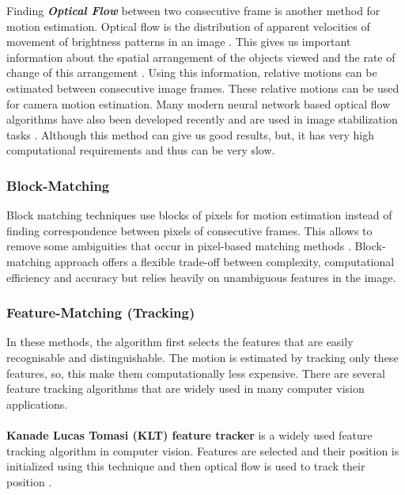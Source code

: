 Finding  \textbf{\textit{Optical Flow}} between two consecutive frame is another method for motion estimation. Optical flow is the distribution of apparent velocities of movement of brightness patterns in an image \citep{horn1981determining}. This gives us important information about the spatial arrangement of the objects viewed and the rate of change of this arrangement \citep{gibson1977analysis}. Using this information, relative motions can be estimated between consecutive image frames. These relative motions can be used for camera motion estimation. Many modern neural network based optical flow algorithms have also been developed recently and are used in image stabilization tasks \citep{deep_opti_stab}. Although this method can give us good results, but, it has very high computational requirements and thus can be very slow.

\subsubsection{Block-Matching}
Block matching techniques use blocks of pixels for motion estimation instead of finding correspondence between pixels of consecutive frames. This allows to remove some ambiguities that occur in pixel-based matching methods \citep{dis_review}. Block-matching approach offers a flexible trade-off between complexity, computational efficiency and accuracy \citep{dis_review} but relies heavily on unambiguous features in the image.

\subsubsection{Feature-Matching (Tracking)}
In these methods, the algorithm first selects the features that are easily recognisable and distinguishable. The motion is estimated by tracking only these features, so, this make them computationally less expensive. There are several feature tracking algorithms that are widely used in many computer vision applications.

\paragraph{}\textbf{Kanade Lucas Tomasi (KLT) feature tracker} \citep{tomasi1991detection} is a widely used feature tracking algorithm in computer vision. Features are selected and their position is initialized using this technique and then optical flow is used to track their position \citep{dis_review}.

